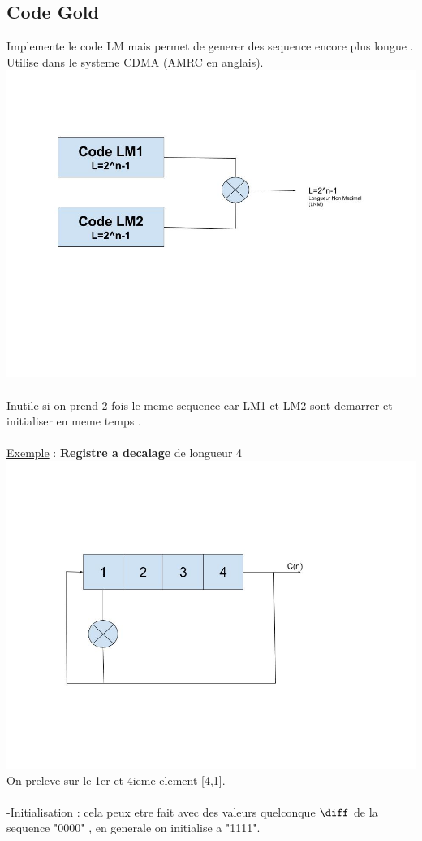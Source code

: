 \documentclass[a4paper,8pt,openany]{book}
\begin{document}
\subsection{Code Gold}
Implemente le code LM mais permet de generer des sequence encore plus longue . Utilise dans le systeme CDMA (AMRC en anglais).\\
\includegraphics[width=0.75\linewidth,center]{img/code_Gold.jpg}\\
\\
Inutile si on prend 2 fois le meme sequence car LM1 et LM2 sont demarrer et initialiser en meme temps .\\
\\
\underline{Exemple} : \textbf{Registre a decalage} de longueur 4\\
\includegraphics[width=0.75\linewidth,center]{img/registre_a_decalage.jpg}\\
On preleve sur le 1er et 4ieme element [4,1].\\
\\
-Initialisation : cela peux etre fait avec des valeurs quelconque $\diff$ de la sequence "0000" , en generale on initialise a "1111".\\
\end{document}

